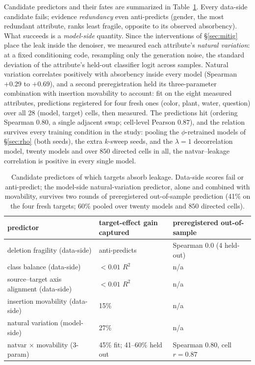 \documentclass[11pt]{article}
\begin{document}
Candidate predictors and their fates are summarized in
Table~\ref{tab:predictors}. Every data-side candidate fails; evidence
\emph{redundancy} even anti-predicts (gender, the most redundant attribute,
ranks least fragile, opposite to its observed absorbency). What succeeds is a
\emph{model-side} quantity. Since the interventions of \S\ref{sec:mitig}
place the leak inside the denoiser, we measured each attribute's
\emph{natural variation}: at a fixed conditioning code, resampling only the
generation noise, the standard deviation of the attribute's held-out
classifier logit across samples. Natural variation correlates positively with
absorbency inside every model (Spearman $+0.29$ to $+0.69$), and a second
preregistration held its three-parameter combination with insertion
movability to account: fit on the eight measured attributes, predictions
registered for four fresh ones (color, plant, water, question) over all 28
(model, target) cells, then measured. The predictions hit (ordering Spearman
$0.80$, a single adjacent swap; cell-level Pearson $0.87$), and the relation
survives every training condition in the study: pooling the $\phi$-retrained
models of \S\ref{sec:rho} (both seeds), the extra $k$-sweep seeds, and the
$\lambda{=}1$ decorrelation model, twenty models and over $850$ directed
cells in all, the natvar--leakage correlation is positive in every single
model.

\begin{table}[h]\centering\small
\begin{tabular}{l l l}
predictor & target-effect gain captured & preregistered out-of-sample \\
\hline
deletion fragility (data-side)   & anti-predicts & Spearman $0.0$ (4 held-out) \\
class balance (data-side)        & ${<}0.01$ $R^2$ & n/a \\
source--target axis alignment (data-side) & ${<}0.01$ $R^2$ & n/a \\
insertion movability (data-side) & 15\% & n/a \\
natural variation (model-side)   & 27\% & n/a \\
natvar $\times$ movability (3-param) & 45\% fit; 41--60\% held out & Spearman $0.80$, cell $r{=}0.87$ \\
\end{tabular}
\caption{Candidate predictors of which targets absorb leakage. Data-side
scores fail or anti-predict; the model-side natural-variation predictor,
alone and combined with movability, survives two rounds of preregistered
out-of-sample prediction (41\% on the four fresh targets; 60\% pooled over
twenty models and $850$ directed cells).}
\label{tab:predictors}
\end{table}
\end{document}
